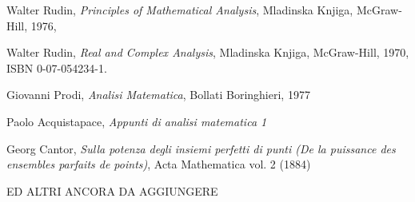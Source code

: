 \documentclass[12pt]{article}
\begin{document}
\newpage
\begin{thebibliography}{9}

  Walter Rudin, \textit{Principles of Mathematical Analysis}, Mladinska Knjiga, McGraw-Hill, 1976,

 Walter Rudin, \textit{Real and Complex Analysis}, Mladinska Knjiga, McGraw-Hill, 1970, ISBN 0-07-054234-1.

 Giovanni Prodi, \textit{Analisi Matematica}, Bollati Boringhieri, 1977 

 Paolo Acquistapace, \textit{Appunti di analisi matematica 1}

 Georg Cantor, \emph{Sulla potenza degli insiemi perfetti di punti (De la puissance des ensembles parfaits de points)}, Acta Mathematica vol. 2 (1884)

\begin{center}
    ED ALTRI ANCORA DA AGGIUNGERE
\end{center}


\end{thebibliography}
\end{document}
